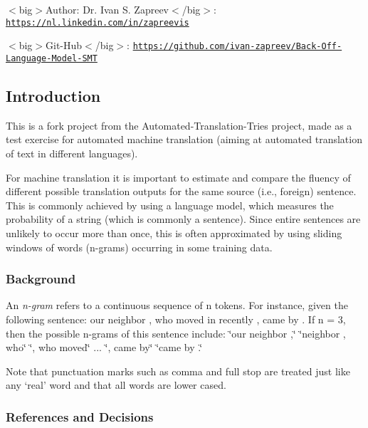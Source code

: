 $<$big$>$Author\+: Dr. Ivan S. Zapreev$<$/big$>$\+: \href{https://nl.linkedin.com/in/zapreevis}{\tt https\+://nl.\+linkedin.\+com/in/zapreevis}

$<$big$>$Git-\/\+Hub$<$/big$>$\+: \href{https://github.com/ivan-zapreev/Back-Off-Language-Model-SMT}{\tt https\+://github.\+com/ivan-\/zapreev/\+Back-\/\+Off-\/\+Language-\/\+Model-\/\+S\+M\+T}

\subsection*{Introduction}

This is a fork project from the Automated-\/\+Translation-\/\+Tries project, made as a test exercise for automated machine translation (aiming at automated translation of text in different languages).

For machine translation it is important to estimate and compare the fluency of different possible translation outputs for the same source (i.\+e., foreign) sentence. This is commonly achieved by using a language model, which measures the probability of a string (which is commonly a sentence). Since entire sentences are unlikely to occur more than once, this is often approximated by using sliding windows of words (n-\/grams) occurring in some training data.

\subsubsection*{Background}

An {\itshape n-\/gram} refers to a continuous sequence of n tokens. For instance, given the following sentence\+: our neighbor , who moved in recently , came by . If n = 3, then the possible n-\/grams of this sentence include\+: {\ttfamily  \char`\"{}our neighbor ,\char`\"{} \char`\"{}neighbor , who\char`\"{} \char`\"{}, who moved\char`\"{} ... \char`\"{}, came by\char`\"{} \char`\"{}came by .\char`\"{} }

Note that punctuation marks such as comma and full stop are treated just like any ‘real’ word and that all words are lower cased.

\subsubsection*{References and Decisions}

